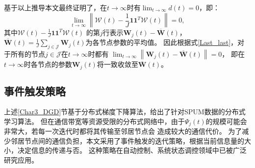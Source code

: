 基于以上推导本文最终证明了，在$t\to\infty$时有$\lim_{t\to\infty}d\left(t\right)=0$，即：
\begin{equation}
    \label{Last_last}
    \lim_{t\to\infty}\left\|\boldsymbol{\mathcal{W}}\left(t\right) 
    - \frac{1}{J}\boldsymbol1\boldsymbol1^T\boldsymbol{\mathcal{W}}\left(t\right)\right\|=0,
\end{equation}
其中$\boldsymbol{\mathcal{W}}\left(t\right)- \frac{1}{J}\boldsymbol1\boldsymbol1^T\boldsymbol{\mathcal{W}}\left(t\right)$
的第$j$行表示$\boldsymbol W_j\left(t\right)-\overline{\boldsymbol W}\left(t\right)$，
$\overline{\boldsymbol W}\left(t\right)=\frac{1}{J}\sum_{j\in\mathcal{J}}\boldsymbol W_j\left(t\right)$为各节点参数的平均值。
因此根据式\eqref{Last_last}，对于所有的节点$j\in\mathcal{J}$在$t\to\infty$时都有
$\lim_{t\to\infty}\left\|\boldsymbol W_j\left(t\right)-\overline{\boldsymbol W}\left(t\right)\right\|=0$，
即在$t\to\infty$时各节点的参数$\boldsymbol W_j\left(t\right)$将一致收敛至$\overline{\boldsymbol W}\left(t\right)$。

\subsection{事件触发策略}
上述\ref{Char3_DGD}节基于分布式梯度下降算法，给出了针对SPUM数据的分布式学习算法。
但在通信带宽等资源受限的分布式网络中，由于$\boldsymbol\varPsi_j\left(t\right)$的规模可能会非常大，若每一次迭代时都将其传输至邻居节点会
造成较大的通信代价\cite{Li_Event_2015, Ge_Event_2020}。
为了减少邻居节点间的通信负担，本文采用了事件触发的迭代策略，根据当前信息量的大小，决定信息的传递与否。
这种策略在自动控制、系统状态调控领域中已被广泛研究应用\cite{Gao_Event_2021, Liang_Event_2020}。

